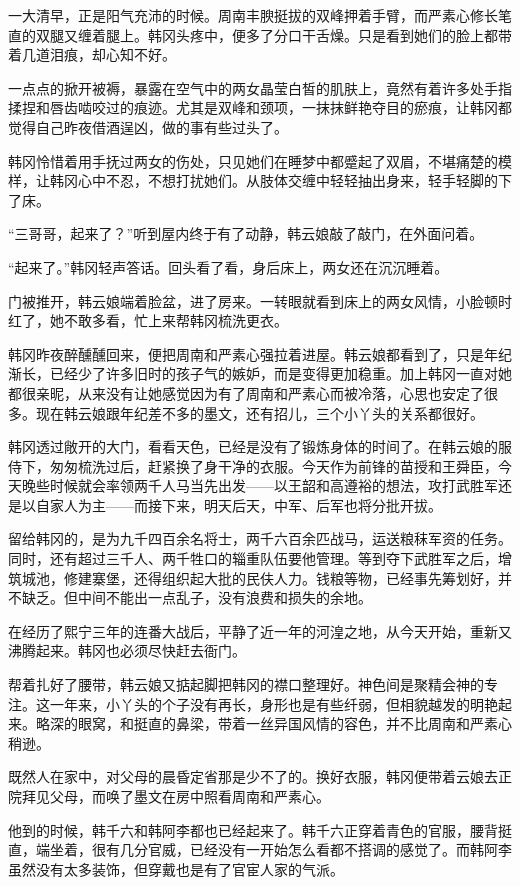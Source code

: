 一大清早，正是阳气充沛的时候。周南丰腴挺拔的双峰押着手臂，而严素心修长笔直的双腿又缠着腿上。韩冈头疼中，便多了分口干舌燥。只是看到她们的脸上都带着几道泪痕，却心知不好。

一点点的掀开被褥，暴露在空气中的两女晶莹白皙的肌肤上，竟然有着许多处手指揉捏和唇齿啮咬过的痕迹。尤其是双峰和颈项，一抹抹鲜艳夺目的瘀痕，让韩冈都觉得自己昨夜借酒逞凶，做的事有些过头了。

韩冈怜惜着用手抚过两女的伤处，只见她们在睡梦中都蹙起了双眉，不堪痛楚的模样，让韩冈心中不忍，不想打扰她们。从肢体交缠中轻轻抽出身来，轻手轻脚的下了床。

“三哥哥，起来了？”听到屋内终于有了动静，韩云娘敲了敲门，在外面问着。

“起来了。”韩冈轻声答话。回头看了看，身后床上，两女还在沉沉睡着。

门被推开，韩云娘端着脸盆，进了房来。一转眼就看到床上的两女风情，小脸顿时红了，她不敢多看，忙上来帮韩冈梳洗更衣。

韩冈昨夜醉醺醺回来，便把周南和严素心强拉着进屋。韩云娘都看到了，只是年纪渐长，已经少了许多旧时的孩子气的嫉妒，而是变得更加稳重。加上韩冈一直对她都很亲昵，从来没有让她感觉因为有了周南和严素心而被冷落，心思也安定了很多。现在韩云娘跟年纪差不多的墨文，还有招儿，三个小丫头的关系都很好。

韩冈透过敞开的大门，看看天色，已经是没有了锻炼身体的时间了。在韩云娘的服侍下，匆匆梳洗过后，赶紧换了身干净的衣服。今天作为前锋的苗授和王舜臣，今天晚些时候就会率领两千人马当先出发——以王韶和高遵裕的想法，攻打武胜军还是以自家人为主——而接下来，明天后天，中军、后军也将分批开拔。

留给韩冈的，是为九千四百余名将士，两千六百余匹战马，运送粮秣军资的任务。同时，还有超过三千人、两千牲口的辎重队伍要他管理。等到夺下武胜军之后，增筑城池，修建寨堡，还得组织起大批的民伕人力。钱粮等物，已经事先筹划好，并不缺乏。但中间不能出一点乱子，没有浪费和损失的余地。

在经历了熙宁三年的连番大战后，平静了近一年的河湟之地，从今天开始，重新又沸腾起来。韩冈也必须尽快赶去衙门。

帮着扎好了腰带，韩云娘又掂起脚把韩冈的襟口整理好。神色间是聚精会神的专注。这一年来，小丫头的个子没有再长，身形也是有些纤弱，但相貌越发的明艳起来。略深的眼窝，和挺直的鼻梁，带着一丝异国风情的容色，并不比周南和严素心稍逊。

既然人在家中，对父母的晨昏定省那是少不了的。换好衣服，韩冈便带着云娘去正院拜见父母，而唤了墨文在房中照看周南和严素心。

他到的时候，韩千六和韩阿李都也已经起来了。韩千六正穿着青色的官服，腰背挺直，端坐着，很有几分官威，已经没有一开始怎么看都不搭调的感觉了。而韩阿李虽然没有太多装饰，但穿戴也是有了官宦人家的气派。

